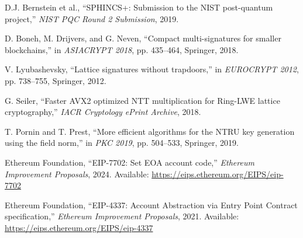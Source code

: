 \documentclass[11pt,a4paper]{article}
\begin{document}
\begin{thebibliography}{99}
D.J. Bernstein et al.,
``SPHINCS+: Submission to the NIST post-quantum project,''
\textit{NIST PQC Round 2 Submission}, 2019.

D. Boneh, M. Drijvers, and G. Neven,
``Compact multi-signatures for smaller blockchains,''
in \textit{ASIACRYPT 2018}, pp. 435--464, Springer, 2018.

V. Lyubashevsky,
``Lattice signatures without trapdoors,''
in \textit{EUROCRYPT 2012}, pp. 738--755, Springer, 2012.

G. Seiler,
``Faster AVX2 optimized NTT multiplication for Ring-LWE lattice cryptography,''
\textit{IACR Cryptology ePrint Archive}, 2018.

T. Pornin and T. Prest,
``More efficient algorithms for the NTRU key generation using the field norm,''
in \textit{PKC 2019}, pp. 504--533, Springer, 2019.

Ethereum Foundation,
``EIP-7702: Set EOA account code,''
\textit{Ethereum Improvement Proposals}, 2024.
Available: \url{https://eips.ethereum.org/EIPS/eip-7702}

Ethereum Foundation,
``EIP-4337: Account Abstraction via Entry Point Contract specification,''
\textit{Ethereum Improvement Proposals}, 2021.
Available: \url{https://eips.ethereum.org/EIPS/eip-4337}

\end{thebibliography}
\end{document}
